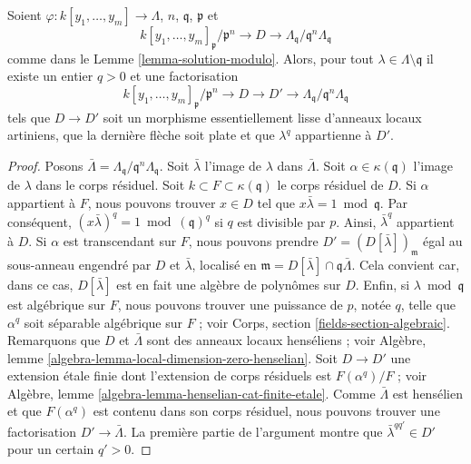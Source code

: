 \begin{lemma}
\label{lemma-enlarge-solution-modulo}
Soient $\varphi : k[y_1, \ldots, y_m] \to \Lambda$, $n$, $\mathfrak q$,
$\mathfrak p$ et
$$
k[y_1, \ldots, y_m]_\mathfrak p/\mathfrak p^n \to
D \to \Lambda_\mathfrak q/\mathfrak q^n \Lambda_\mathfrak q
$$
comme dans le Lemme \ref{lemma-solution-modulo}. Alors, pour tout
$\lambda \in \Lambda \setminus \mathfrak q$
il existe un entier $q > 0$ et une factorisation
$$
k[y_1, \ldots, y_m]_\mathfrak p/\mathfrak p^n \to
D \to D' \to \Lambda_\mathfrak q/\mathfrak q^n \Lambda_\mathfrak q
$$
tels que $D \to D'$ soit un morphisme essentiellement lisse d'anneaux locaux artiniens,
que la dernière flèche soit plate et que $\lambda^q$ appartienne à $D'$.
\end{lemma}

\begin{proof}
Posons $\bar \Lambda = \Lambda_\mathfrak q/\mathfrak q^n\Lambda_\mathfrak q$.
Soit $\bar \lambda$ l'image de $\lambda$ dans $\bar \Lambda$.
Soit $\alpha \in \kappa(\mathfrak q)$ l'image de $\lambda$ dans le
corps résiduel.
Soit $k \subset F \subset \kappa(\mathfrak q)$ le corps résiduel de $D$.
Si $\alpha$ appartient à $F$, nous pouvons trouver
$x \in D$ tel que $x \bar\lambda = 1 \bmod \mathfrak q$. Par conséquent,
$(x \bar \lambda)^q = 1 \bmod (\mathfrak q)^q$ si $q$ est divisible par $p$.
Ainsi, $\bar\lambda^q$ appartient à $D$. Si $\alpha$ est
transcendant sur $F$, nous pouvons prendre $D' = (D[\bar \lambda])_\mathfrak m$
égal au sous-anneau engendré par $D$ et $\bar \lambda$, localisé
en $\mathfrak m = D[\bar \lambda] \cap \mathfrak q \bar \Lambda$.
Cela convient car, dans ce cas, $D[\bar \lambda]$ est en fait une algèbre de polynômes
sur $D$. Enfin, si $\lambda \bmod \mathfrak q$ est
algébrique sur $F$, nous pouvons trouver une puissance de $p$, notée $q$, telle que
$\alpha^q$ soit séparable algébrique sur $F$ ; voir
Corps, section \ref{fields-section-algebraic}.
Remarquons que $D$ et $\bar\Lambda$ sont des anneaux locaux henséliens ; voir
Algèbre, lemme \ref{algebra-lemma-local-dimension-zero-henselian}.
Soit $D \to D'$ une extension étale finie
dont l'extension de corps résiduels est $F(\alpha^q)/F$ ; voir
Algèbre, lemme \ref{algebra-lemma-henselian-cat-finite-etale}.
Comme $\bar\Lambda$ est hensélien et que $F(\alpha^q)$ est contenu
dans son corps résiduel, nous pouvons trouver une factorisation
$D' \to \bar \Lambda$. La première partie de l'argument montre que
$\bar\lambda^{qq'} \in D'$ pour un certain $q' > 0$.
\end{proof}

